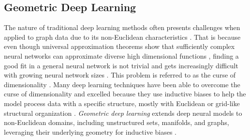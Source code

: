 \subsection{Geometric Deep Learning}
\label{s_Background_GeometricDeepLearning}

The nature of traditional deep learning methods often presents challenges when applied to graph data due to its non-Euclidean characteristics \cite{wu_comprehensive_2021}. That is because even though universal approximation theorems show that sufficiently complex neural networks can approximate diverse high dimensional functions \cite{hornik_multilayer_1989, kratsios_non-euclidean_2020}, finding a good fit in a general neural network is not trivial and gets increasingly difficult with growing neural network sizes \cite{bronstein_geometric_2021}. This problem is referred to as the curse of dimensionality \cite{bellman_dynamic_1966}. Many deep learning techniques have been able to overcome the curse of dimensionality and excelled because they use inductive biases to help the model process data with a specific structure, mostly with Euclidean or grid-like structural organization \cite{bronstein_geometric_2017}. \textit{Geometric deep learning} extends deep neural models to non-Euclidean domains, including unstructured sets, manifolds, and graphs, leveraging their underlying geometry for inductive biases \cite{bronstein_geometric_2017, bronstein_geometric_2021}.

